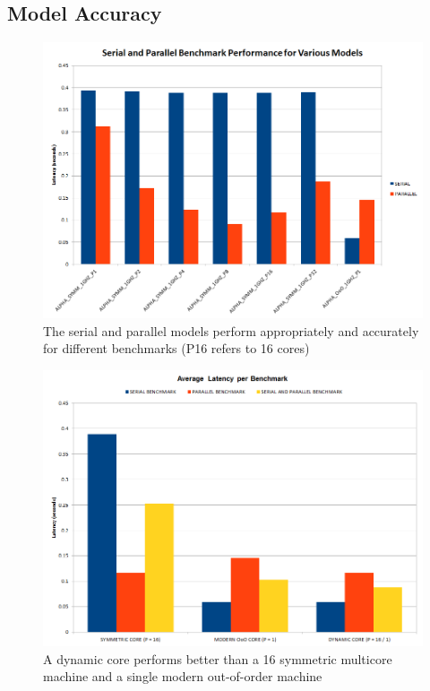 \subsection{Model Accuracy}
\begin{figure}
    \centering
    \includegraphics[scale=0.8]{../images/SerialParallelBenchmarks-Latency.png}
    \caption{The serial and parallel models perform appropriately and accurately for different benchmarks (P16 refers to 16 cores)}
    \label{fig:serialparallel}
\end{figure}
\begin{figure}
    \centering
    \includegraphics[scale=0.8]{../images/DynamicBenchmark-Latency-16.png}
    \caption{A dynamic core performs better than a 16 symmetric multicore machine and a single modern out-of-order machine}
    \label{fig:dynamic}
\end{figure}
